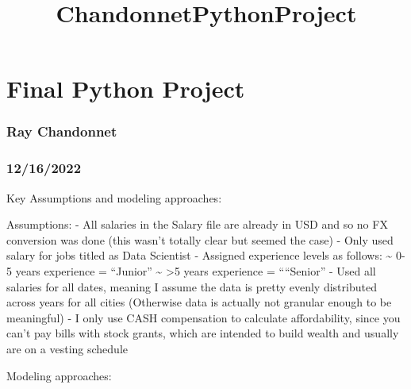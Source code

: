 \documentclass[11pt]{article}
\title{ChandonnetPythonProject}
\begin{document}
    
    \maketitle
    
    

    
    \hypertarget{final-python-project}{%
\section{Final Python Project}\label{final-python-project}}

\hypertarget{ray-chandonnet}{%
\subsubsection{Ray Chandonnet}\label{ray-chandonnet}}

\hypertarget{section}{%
\subsubsection{12/16/2022}\label{section}}

    Key Assumptions and modeling approaches:

Assumptions: - All salaries in the Salary file are already in USD and so
no FX conversion was done (this wasn't totally clear but seemed the
case) - Only used salary for jobs titled as Data Scientist - Assigned
experience levels as follows: \textasciitilde{} 0-5 years experience =
``Junior'' \textasciitilde{} \textgreater5 years experience =
````Senior'' - Used all salaries for all dates, meaning I assume the
data is pretty evenly distributed across years for all cities (Otherwise
data is actually not granular enough to be meaningful) - I only use CASH
compensation to calculate affordability, since you can't pay bills with
stock grants, which are intended to build wealth and usually are on a
vesting schedule

Modeling approaches:
\end{document}
